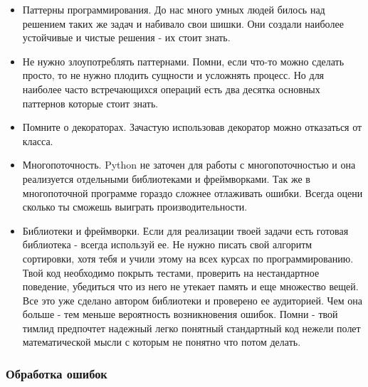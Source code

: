 \begin{itemize}
	\item Паттерны программирования. До нас много умных людей билось над решением таких же задач и набивало свои шишки. Они создали наиболее устойчивые и чистые решения - их стоит знать.
	\item Не нужно злоупотреблять паттернами. Помни, если что-то можно сделать просто, то не нужно плодить сущности и усложнять процесс. Но для наиболее часто встречающихся операций есть два десятка основных паттернов которые стоит знать.
	\item Помните о декораторах. Зачастую использовав декоратор можно отказаться от класса.
	\item Многопоточность. Python не заточен для работы с многопоточностью и она реализуется отдельными библиотеками и фреймворками. Так же в многопоточной программе гораздо сложнее отлаживать ошибки. Всегда оцени сколько ты сможешь выиграть производительности.
	\item Библиотеки и фреймворки. Если для реализации твоей задачи есть готовая библиотека - всегда используй ее. Не нужно писать свой алгоритм сортировки, хотя тебя и учили этому на всех курсах по программированию. Твой код необходимо покрыть тестами, проверить на нестандартное поведение, убедиться что из него не утекает память и еще множество вещей. Все это уже сделано автором библиотеки и проверено ее аудиторией. Чем она больше - тем меньше вероятность возникновения ошибок. Помни - твой тимлид предпочтет надежный легко понятный стандартный код нежели полет математической мысли с которым не понятно что потом делать.
\end{itemize}

\subsubsection{Обработка ошибок}

